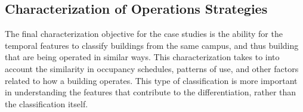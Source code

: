 \subsection{Characterization of Operations Strategies}
\label{sec:operations_strategies}

The final characterization objective for the case studies is the ability for the temporal features to classify buildings from the same campus, and thus building that are being operated in similar ways. This characterization takes to into account the similarity in occupancy schedules, patterns of use, and other factors related to how a building operates. This type of classification is more important in understanding the features that contribute to the differentiation, rather than the classification itself.


